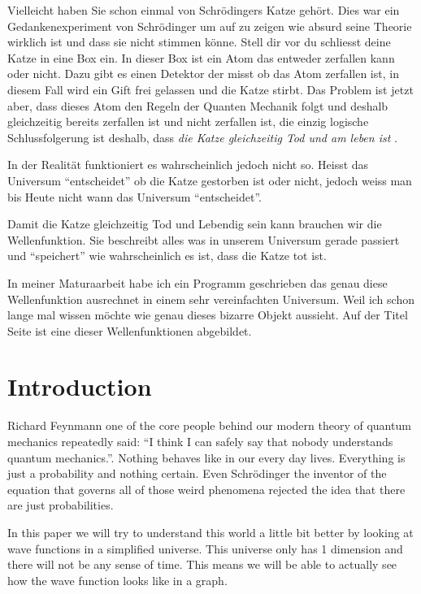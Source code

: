 \documentclass[11pt,DIV=10,final]{scrreprt} %
\begin{document}
Vielleicht haben Sie schon einmal von Schrödingers Katze gehört. Dies war ein Gedankenexperiment von Schrödinger um auf zu zeigen wie absurd seine Theorie wirklich ist und dass sie nicht stimmen könne.
Stell dir vor du schliesst deine Katze in eine Box ein. In dieser Box ist ein Atom das entweder zerfallen kann oder nicht. Dazu gibt es einen Detektor der misst ob das Atom zerfallen ist, in diesem Fall
wird ein Gift frei gelassen und die Katze stirbt.
Das Problem ist jetzt aber, dass dieses Atom den Regeln der Quanten Mechanik folgt und deshalb gleichzeitig bereits zerfallen ist und nicht zerfallen ist, die einzig logische Schlussfolgerung ist deshalb,
dass \emph{die Katze gleichzeitig Tod und am leben ist} \citep{schrodinger1935gegenwartige}.

In der Realität funktioniert es wahrscheinlich jedoch nicht so. Heisst das Universum ``entscheidet'' ob die Katze gestorben ist oder nicht, jedoch weiss man bis Heute nicht wann das Universum ``entscheidet''.

Damit die Katze gleichzeitig Tod und Lebendig sein kann brauchen wir die Wellenfunktion. Sie beschreibt alles was in unserem Universum gerade passiert und ``speichert'' wie wahrscheinlich es ist, dass die Katze tot ist.

In meiner Maturaarbeit habe ich ein Programm geschrieben das genau diese Wellenfunktion ausrechnet in einem sehr vereinfachten Universum. Weil ich schon lange mal wissen möchte wie genau dieses bizarre Objekt aussieht. Auf der Titel Seite ist eine dieser Wellenfunktionen abgebildet.

\pagebreak[4]

\chapter{Introduction}  %
Richard Feynmann one of the core people behind our modern theory of quantum mechanics repeatedly said: ``I think I can safely say that nobody understands quantum mechanics.''.
Nothing behaves like in our every day lives. Everything is just a probability and nothing certain.
Even Schrödinger the inventor of the equation that governs all of those weird phenomena rejected the idea that there are just probabilities.

In this paper we will try to understand this world a little bit better by looking at wave functions in a simplified universe.
This universe only has 1 dimension and there will not be any sense of time. This means we will be able to actually see how the wave function looks like in a graph.
\end{document}
